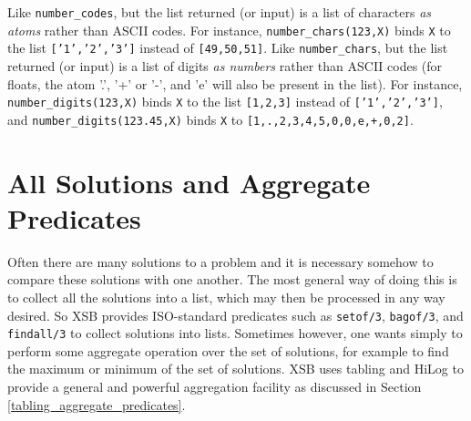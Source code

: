 \begin{description}
    Like \verb|number_codes|, but the list returned (or input) is a list of
    characters \emph{as atoms} rather than ASCII codes. For instance, 
    \verb|number_chars(123,X)| binds {\tt X} to the list {\tt ['1','2','3']}
    instead of {\tt [49,50,51]}.
    Like \verb|number_chars|, but the list returned (or input) is a list of
    digits \emph{as numbers} rather than ASCII codes (for floats, the atom
    '.', '+' or '-', and 'e' will also be present in the list). For instance, 
    \verb|number_digits(123,X)| binds {\tt X} to the list {\tt [1,2,3]}
    instead of {\tt ['1','2','3']}, and \verb|number_digits(123.45,X)|
    binds {\tt X} to {\tt [1,.,2,3,4,5,0,0,e,+,0,2]}.


\end{description}


\section{All Solutions and Aggregate Predicates}
 
Often there are many solutions to a problem and it is necessary
somehow to compare these solutions with one another.  The most general
way of doing this is to collect all the solutions into a list, which
may then be processed in any way desired.  So XSB provides
ISO-standard predicates such as {\tt setof/3}, {\tt bagof/3}, and {\tt
findall/3} to collect solutions into lists.  Sometimes however, one
wants simply to perform some aggregate operation over the set of
solutions, for example to find the maximum or minimum of the set of
solutions.  XSB uses tabling and HiLog to provide a general and
powerful aggregation facility as discussed in Section
\ref{tabling_aggregate_predicates}.

